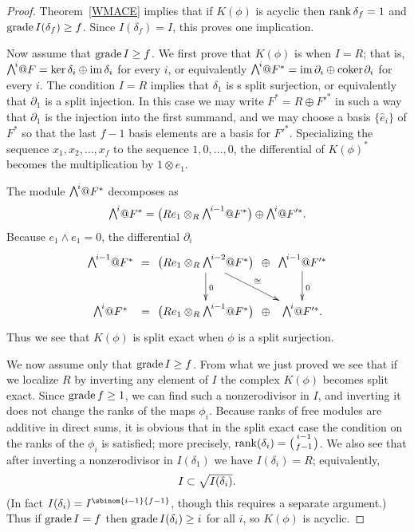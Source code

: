 \begin{proof}
Theorem~\ref{WMACE} 
implies that if $K(\phi)$ is acyclic then
$\operatorname{rank} \delta_{f} = 1$ and $\operatorname{grade} I(\delta_{f}) \geq f$. Since
$I(\delta_{f}) = I$, this proves one implication.

Now assume that $\operatorname{grade} I \geq f$. We first prove that
$K(\phi)$ is 
%
when $I = R$; that is, 
$\mwedge^{i}@F = \ker \delta_{i} \oplus \im \delta_{i}$ 
for every $i$, or equivalently
$\mwedge^{i}@F^{*} = \im \partial_{i}\oplus\coker \partial_{i}$ for
every $i$. The condition $I=R$ implies that $\delta_{1}$ is s split
surjection,
or equivalently that
$\partial_{1}$ is a split injection. In this case we may write $F^{*}
= R\oplus F'^{*}$ in such a way that $\partial_{1}$ is the injection
into the first summand, and we may
choose a basis $\{\hat e_{i}\}$ of $F^{*}$ so that the last $f-1$ basis
elements are a basis for $F'^{*}$.
Specializing the sequence $x_{1},x_{2}, \dots, x_{f}$ to the sequence $1,
0,\dots, 0$, the differential of $K(\phi)^{*}$
becomes the multiplication by  $1\otimes e_{1}$.

The module
$\mwedge^{i}@F^{*}$  decomposes as
$$
\mwedge^{i}@F^{*} = \bigl(Re_{1}\otimes_{R} \mwedge^{i-1}@F^{*} \bigr)
\oplus \mwedge^{i}@F'^{*}.
$$
Because $e_{1}\wedge e_{1} = 0$, the differential $\partial_{i}$ 
$$
\xymatrix@C=1pt{
\mwedge^{i-1}@F^{*} &=& \bigl(Re_{1}\otimes_{R} \mwedge^{i-2}@F^{*} \bigr)
\ar[d]^0 \ar[rrd]^{\cong}
&
\oplus 
&\mwedge^{i-1}@F'^{*}
\ar[d]^0\\
\mwedge^{i}@F^{*} &=& \bigl(Re_{1}\otimes_{R} \mwedge^{i-1}@F^{*} \bigr)
&\oplus &\mwedge^{i}@F'^{*}.
}
$$
Thus we see that $K(\phi)$ is split exact when $\phi$ is a split
surjection.

We now assume only that $\operatorname{grade} I\geq f$. From what we just proved we
see that if we localize
$R$ by inverting any element of $I$ the complex $K(\phi)$ becomes split
exact. Since $\operatorname{grade} f\geq 1$,
we can find such  a nonzerodivisor in $I$, and inverting it does not
change the ranks of the
maps $\phi_{i}$. Because ranks of free modules are additive in direct
sums, it is obvious that
in the split exact case the condition on the ranks of the $\phi_{i}$
is satisfied; more precisely,
$\rank(\delta_{i}) = \tbinom{i-1}{f-1}$. We also see that after inverting
a nonzerodivisor in $I(\delta_{1})$ we have $I(\delta_{i}) = R$;
equivalently,
$$
\tsty %
I  \subset \sqrt {I(\delta_{i})}.
$$
(In fact $I(\delta_{i}) = I^{\sbinom{i-1}{f-1}}$, though this requires a
separate argument.) Thus if $\operatorname{grade} I = f$ then  $\operatorname{grade} I(\delta_{i})
\geq i$ for all $i$, so $K(\phi)$ is acyclic.
\end{proof}

